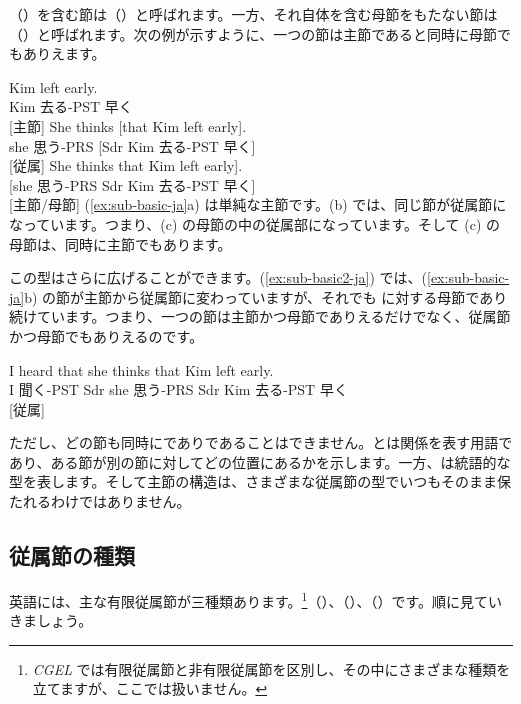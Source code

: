 （）を含む節は（）と呼ばれます。一方、それ自体を含む母節をもたない節は（）と呼ばれます。次の例が示すように、一つの節は主節であると同時に母節でもありえます。

\ea \label{ex:sub-basic-ja}
    \ea \gll Kim left early.\\
        Kim 去る-PST 早く\\
    \glt {} [主節]
    \ex \gll She thinks {[}that Kim left early{]}.\\
        she 思う-PRS {[}Sdr Kim 去る-PST 早く{]}\\
    \glt {} [従属]
    \ex \gll {[}She thinks that Kim left early{]}.\\
        {[}she 思う-PRS Sdr Kim 去る-PST 早く{]}\\
    \glt {} [主節/母節]
    \z
\z
(\ref{ex:sub-basic-ja}a) は単純な主節です。(b) では、同じ節が従属節になっています。つまり、(c) の母節の中の従属部になっています。そして (c) の母節は、同時に主節でもあります。

この型はさらに広げることができます。(\ref{ex:sub-basic2-ja}) では、(\ref{ex:sub-basic-ja}b) の節が主節から従属節に変わっていますが、それでも  に対する母節であり続けています。つまり、一つの節は主節かつ母節でありえるだけでなく、従属節かつ母節でもありえるのです。

\ea\label{ex:sub-basic2-ja}
\gll I heard {\ob}that she thinks {\ob}that Kim left early{\cb}{\cb}.\\
    I 聞く-PST Sdr she 思う-PRS Sdr Kim 去る-PST 早く\\
\glt {} [従属]
\z

ただし、どの節も同時にでありであることはできません。とは関係を表す用語であり、ある節が別の節に対してどの位置にあるかを示します。一方、は統語的な型を表します。そして主節の構造は、さまざまな従属節の型でいつもそのまま保たれるわけではありません。

\subsection{従属節の種類}

英語には、主な有限従属節が三種類あります。\footnote{\textit{CGEL} では有限従属節と非有限従属節を区別し、その中にさまざまな種類を立てますが、ここでは扱いません。}（）、（）、（）です。順に見ていきましょう。

